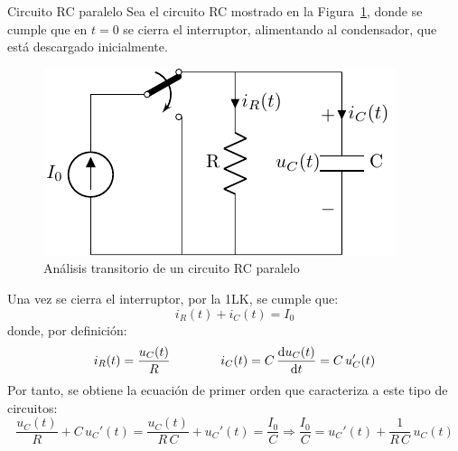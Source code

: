 \documentclass[11pt]{book} %
\makeatletter
\numberwithin{dummy}{section}
\theoremstyle{ocrenumbox}
\theoremstyle{blacknumex}
\theoremstyle{blacknumbox}
\theoremstyle{ocrenum}
\renewcommand{\subsection}{\@startsection {subsection}{2}{\z@}
{-3ex \@plus -0.1ex \@minus -.4ex}
{0.5ex \@plus.2ex }
{\normalfont\sffamily\bfseries}}
\makeatother
\begin{document}
	
    \subsection{Circuito RC paralelo}
	Sea el circuito RC mostrado en la Figura~\ref{fig.transitorio_RC}, donde se cumple que en $t = 0$ se cierra el interruptor, alimentando al condensador, que está descargado inicialmente. 
	\begin{figure}[htbp]
	    \centering
	    \includegraphics{../figs/transitorio_circuitoRC.pdf}
	    \caption{Análisis transitorio de un circuito RC paralelo}
	    \label{fig.transitorio_RC}
	\end{figure}
	
    Una vez se cierra el interruptor, por la 1LK, se cumple que:
	\begin{equation*}
	    i_R(t) + i_C(t) = I_0
	\end{equation*}
	donde, por definición: 
	\begin{equation*}
	    i_R(t)=\dfrac{u_C(t)}{R}\qquad\qquad i_C(t)=C\,\diff{u_C(t)}{t}=C\,u_C'(t)
	\end{equation*}
	Por tanto, se obtiene la ecuación de primer orden que caracteriza a este tipo de circuitos:
	\begin{equation}\label{eq.1orden_C}
	    \dfrac{u_C(t)}{R}+C\, u_C'(t)=\dfrac{u_C(t)}{R\,C}+u_C'(t)=\dfrac{I_0}{C}\Rightarrow \boxed{\dfrac{I_0}{C}=u_C'(t)+\dfrac{1}{R\, C}\,u_C(t)}
	\end{equation}
	
\end{document}
